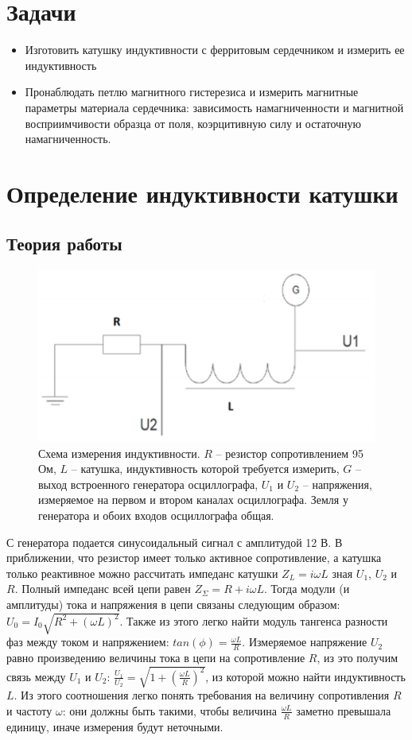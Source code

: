 \documentclass[a4paper,14pt]{extarticle}
\begin{document}
	\section{Задачи}
		\begin{itemize}
			\item Изготовить катушку индуктивности с ферритовым сердечником и измерить ее
			индуктивность
			\item Пронаблюдать петлю магнитного гистерезиса и измерить магнитные параметры материала сердечника: зависимость намагниченности и магнитной восприимчивости образца от поля, коэрцитивную силу и остаточную намагниченность.
		\end{itemize}
	\section{Определение индуктивности катушки}
		\subsection{Теория работы}
			\begin{figure}[h]
				\centering
				\includegraphics[width=.75\linewidth]{схема.png}
				\caption{Схема измерения индуктивности. $R$ – резистор сопротивлением 95 Ом, $L$ – катушка, индуктивность которой требуется измерить, $G$ – выход встроенного	генератора осциллографа, $U_1$ и $U_2$ – напряжения, измеряемое на первом и втором каналах осциллографа. Земля у генератора и обоих входов осциллографа общая.}
				\label{fig1}
			\end{figure}
			\newpage
			С генератора подается синусоидальный сигнал с амплитудой 12 В. В приближении, что резистор имеет только активное сопротивление, а катушка только реактивное можно рассчитать импеданс катушки $Z_L = i \omega L$ зная $U_1$, $U_2$ и $R$. Полный импеданс всей цепи равен $Z_\Sigma =	R + i \omega L$. Тогда модули (и амплитуды) тока и напряжения в цепи связаны следующим образом: $U_0 = I_0 \sqrt{R^2 + (\omega L)^2}$. Также из этого легко найти модуль тангенса разности фаз между током и напряжением: $tan(\phi) = \frac{\omega L}{R}$. Измеряемое напряжение $U_2$ равно произведению величины тока в цепи на сопротивление $R$, из это получим связь между $U_1$ и $U_2$: $\frac{U_1}{U_2} = \sqrt{1 + (\frac{\omega L}{R})^2}$, из которой можно найти индуктивность $L$. Из этого соотношения легко понять требования на величину сопротивления $R$ и частоту $\omega$: они должны быть такими, чтобы величина $\frac{\omega L}{R}$ заметно превышала единицу, иначе измерения будут неточными.
\end{document}
